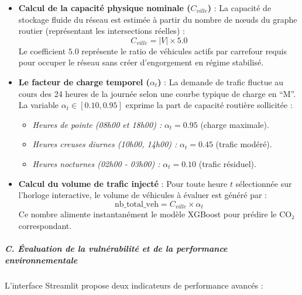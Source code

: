\documentclass[10pt, a4paper]{article}
\providecommand{\tightlist}{}
\begin{document}
\begin{itemize}
\item
  \textbf{Calcul de la capacité physique nominale (\(C_{ville}\))} : La
  capacité de stockage fluide du réseau est estimée à partir du nombre
  de nœuds du graphe routier (représentant les intersections réelles) :
  \[C_{ville} = |V| \times 5.0\] Le coefficient \(5.0\) représente le
  ratio de véhicules actifs par carrefour requis pour occuper le réseau
  sans créer d'engorgement en régime stabilisé.
\item
  \textbf{Le facteur de charge temporel (\(\alpha_t\))} : La demande de
  trafic fluctue au cours des 24 heures de la journée selon une courbe
  typique de charge en ``M''. La variable \(\alpha_t \in [0.10, 0.95]\)
  exprime la part de capacité routière sollicitée :

  \begin{itemize}
  \tightlist
  \item
    \emph{Heures de pointe (08h00 et 18h00) :} \(\alpha_t = 0.95\)
    (charge maximale).
  \item
    \emph{Heures creuses diurnes (10h00, 14h00) :} \(\alpha_t = 0.45\)
    (trafic modéré).
  \item
    \emph{Heures nocturnes (02h00 - 03h00) :} \(\alpha_t = 0.10\)
    (trafic résiduel).
  \end{itemize}
\item
  \textbf{Calcul du volume de trafic injecté} : Pour toute heure \(t\)
  sélectionnée sur l'horloge interactive, le volume de véhicules à
  évaluer est généré par :
  \[\text{nb\_total\_veh} = C_{ville} \times \alpha_t\] Ce nombre
  alimente instantanément le modèle XGBoost pour prédire le CO₂
  correspondant.
\end{itemize}

\subparagraph{C. Évaluation de la vulnérabilité et de la performance
environnementale}\label{c.-uxe9valuation-de-la-vulnuxe9rabilituxe9-et-de-la-performance-environnementale}

L'interface Streamlit propose deux indicateurs de performance avancés :
\end{document}
